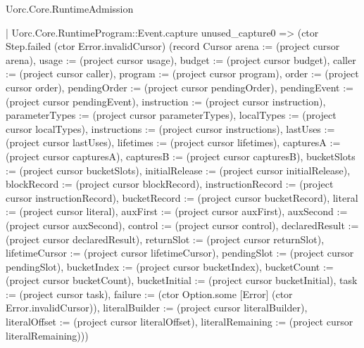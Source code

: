 \begin{lexlean}{Uorc.Core.RuntimeAdmission}
\begin{semanticmodule}
{          | Uorc.Core.RuntimeProgram::Event.capture unused_capture0 => (ctor Step.failed (ctor Error.invalidCursor) (record Cursor {arena := (project cursor arena), usage := (project cursor usage), budget := (project cursor budget), caller := (project cursor caller), program := (project cursor program), order := (project cursor order), pendingOrder := (project cursor pendingOrder), pendingEvent := (project cursor pendingEvent), instruction := (project cursor instruction), parameterTypes := (project cursor parameterTypes), localTypes := (project cursor localTypes), instructions := (project cursor instructions), lastUses := (project cursor lastUses), lifetimes := (project cursor lifetimes), capturesA := (project cursor capturesA), capturesB := (project cursor capturesB), bucketSlots := (project cursor bucketSlots), initialRelease := (project cursor initialRelease), blockRecord := (project cursor blockRecord), instructionRecord := (project cursor instructionRecord), bucketRecord := (project cursor bucketRecord), literal := (project cursor literal), auxFirst := (project cursor auxFirst), auxSecond := (project cursor auxSecond), control := (project cursor control), declaredResult := (project cursor declaredResult), returnSlot := (project cursor returnSlot), lifetimeCursor := (project cursor lifetimeCursor), pendingSlot := (project cursor pendingSlot), bucketIndex := (project cursor bucketIndex), bucketCount := (project cursor bucketCount), bucketInitial := (project cursor bucketInitial), task := (project cursor task), failure := (ctor Option.some [Error] (ctor Error.invalidCursor)), literalBuilder := (project cursor literalBuilder), literalOffset := (project cursor literalOffset), literalRemaining := (project cursor literalRemaining)}))
}
\end{semanticmodule}
\end{lexlean}

